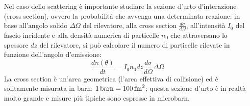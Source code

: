 Nel caso dello scattering è importante studiare la sezione d'urto d'interazione (cross section), ovvero la probabilità che avvenga una determinata reazione: in base all'angolo solido $ \Delta\Omega $ del rilevatore, alla cross section $ \frac{d\sigma}{d\Omega} $, all'intensità $ I_0 $ del fascio incidente e alla densità numerica di particelle $ n_0 $ che attraversano lo spessore $ dz $ del rilevatore, si può calcolare il numero di particelle rilevate in funzione dell'angolo d'emissione:
\begin{equation}
  \frac{dn(\theta)}{dt} = I_0 n_0 dz \frac{d\sigma}{d\Omega} \Delta\Omega
  \label{eq:1}
\end{equation}
La cross section è un'area geometrica (l'area effettiva di collisione) ed è solitamente misurata in barn: $ 1\,\mathrm{barn} = 100\,\mathrm{fm}^2 $; questa sezione d'urto è in realtà molto grande e misure più tipiche sono espresse in microbarn.

\thispagestyle{introd}
